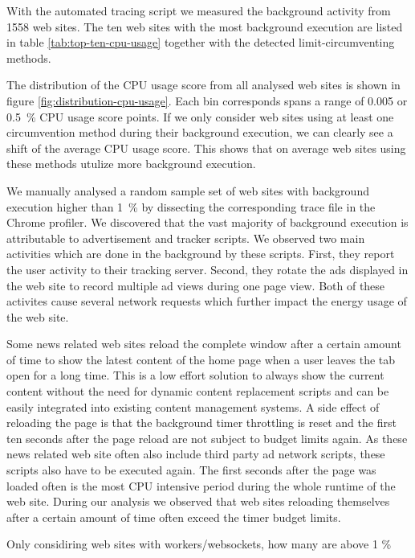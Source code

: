 \documentclass[
	ruledheaders=section,%
	class=report,%
	thesis={type=bachelor},%
	accentcolor=9c,%
	custommargins=true,%
	marginpar=false,%
	parskip=half-,%
	fontsize=11pt,%
]{tudapub}
\begin{document}
  With the automated tracing script we measured the background activity from 1558 web sites. The ten web sites with the most background execution are listed in table \ref{tab:top-ten-cpu-usage} together with the detected limit-circumventing methods.

  The distribution of the CPU usage score from all analysed web sites is shown in figure \ref{fig:distribution-cpu-usage}. Each bin corresponds spans a range of 0.005 or 0.5~\% CPU usage score points. If we only consider web sites using at least one circumvention method during their background execution, we can clearly see a shift of the average CPU usage score. This shows that on average web sites using these methods utulize more background execution.

  We manually analysed a random sample set of web sites with background execution higher than 1~\% by dissecting the corresponding trace file in the Chrome profiler. We discovered that the vast majority of background execution is attributable to advertisement and tracker scripts. We observed two main activities which are done in the background by these scripts. First, they report the user activity to their tracking server. Second, they rotate the ads displayed in the web site to record multiple ad views during one page view. Both of these activites cause several network requests which further impact the energy usage of the web site.
  
  Some news related web sites reload the complete window after a certain amount of time to show the latest content of the home page when a user leaves the tab open for a long time. This is a low effort solution to always show the current content without the need for dynamic content replacement scripts and can be easily integrated into existing content management systems. A side effect of reloading the page is that the background timer throttling is reset and the first ten seconds after the page reload are not subject to budget limits again. As these news related web site often also include third party ad network scripts, these scripts also have to be executed again. The first seconds after the page was loaded often is the most CPU intensive period during the whole runtime of the web site. During our analysis we observed that web sites reloading themselves after a certain amount of time often exceed the timer budget limits.

  

  Only considiring web sites with workers/websockets, how many are above 1 \%
\end{document}
